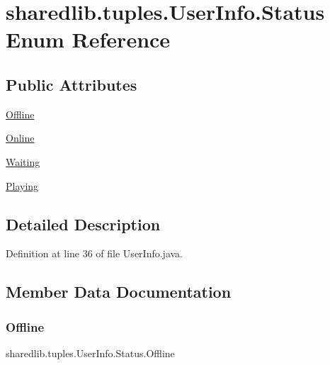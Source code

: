 \hypertarget{enumsharedlib_1_1tuples_1_1_user_info_1_1_status}{}\section{sharedlib.\+tuples.\+User\+Info.\+Status Enum Reference}
\label{enumsharedlib_1_1tuples_1_1_user_info_1_1_status}
\subsection*{Public Attributes}
\begin{DoxyCompactItemize}
\item 
\hyperlink{enumsharedlib_1_1tuples_1_1_user_info_1_1_status_a124ffb7700e17b67f73dafaaa4eec447}{Offline}
\item 
\hyperlink{enumsharedlib_1_1tuples_1_1_user_info_1_1_status_ac9bc1b0a01d06d34eb9297a72261148c}{Online}
\item 
\hyperlink{enumsharedlib_1_1tuples_1_1_user_info_1_1_status_a6a945fcd39eedec2f213774c47bbf53b}{Waiting}
\item 
\hyperlink{enumsharedlib_1_1tuples_1_1_user_info_1_1_status_a084ec6670e26a119c0ac26ea891e7e77}{Playing}
\end{DoxyCompactItemize}


\subsection{Detailed Description}


Definition at line 36 of file User\+Info.\+java.



\subsection{Member Data Documentation}
\hypertarget{enumsharedlib_1_1tuples_1_1_user_info_1_1_status_a124ffb7700e17b67f73dafaaa4eec447}{}\label{enumsharedlib_1_1tuples_1_1_user_info_1_1_status_a124ffb7700e17b67f73dafaaa4eec447} 
\subsubsection{\texorpdfstring{Offline}{Offline}}
{\footnotesize\ttfamily sharedlib.\+tuples.\+User\+Info.\+Status.\+Offline}



